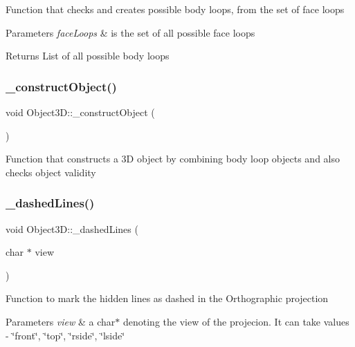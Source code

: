 Function that checks and creates possible body loops, from the set of face loops 
\begin{DoxyParams}{Parameters}
{\em face\+Loops} & is the set of all possible face loops \\
\hline
\end{DoxyParams}
\begin{DoxyReturn}{Returns}
List of all possible body loops 
\end{DoxyReturn}
\mbox{\label{class_object3_d_a53eb59ed67548b9c941aa2607989c680}} 
\subsubsection{\texorpdfstring{\+\_\+construct\+Object()}{\_constructObject()}}
{\footnotesize\ttfamily void Object3\+D\+::\+\_\+construct\+Object (\begin{DoxyParamCaption}{ }\end{DoxyParamCaption})\hspace{0.3cm}{\ttfamily [protected]}}

Function that constructs a 3D object by combining body loop objects and also checks object validity \mbox{\label{class_object3_d_a0cca4c6ad91f75fd5ba31a2f97c84fdf}} 
\subsubsection{\texorpdfstring{\+\_\+dashed\+Lines()}{\_dashedLines()}}
{\footnotesize\ttfamily void Object3\+D\+::\+\_\+dashed\+Lines (\begin{DoxyParamCaption}\item[{char $\ast$}]{view }\end{DoxyParamCaption})\hspace{0.3cm}{\ttfamily [protected]}}

Function to mark the hidden lines as dashed in the Orthographic projection 
\begin{DoxyParams}{Parameters}
{\em view} & a char$\ast$ denoting the view of the projecion. It can take values -\/ \char`\"{}front\char`\"{}, \char`\"{}top\char`\"{}, \char`\"{}rside\char`\"{}, \char`\"{}lside\char`\"{} \\
\hline
\end{DoxyParams}
\mbox{\label{class_object3_d_ad6a51c52f7e5109270b7097ab2ca6397}} 
